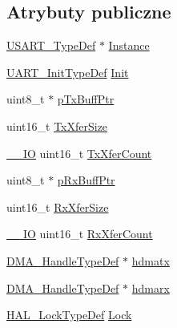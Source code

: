 \subsection*{Atrybuty publiczne}
\begin{DoxyCompactItemize}
\item 
\hyperlink{struct_u_s_a_r_t___type_def}{U\+S\+A\+R\+T\+\_\+\+Type\+Def} $\ast$ \hyperlink{struct_____u_a_r_t___handle_type_def_aadd8a626e4d5dd937ee1b6461365831a}{Instance}
\item 
\hyperlink{struct_u_a_r_t___init_type_def}{U\+A\+R\+T\+\_\+\+Init\+Type\+Def} \hyperlink{struct_____u_a_r_t___handle_type_def_a56ed519d3ec77350c528fb8536bd9f5a}{Init}
\item 
uint8\+\_\+t $\ast$ \hyperlink{struct_____u_a_r_t___handle_type_def_aab963198dfbbcf98902222de810fcc31}{p\+Tx\+Buff\+Ptr}
\item 
uint16\+\_\+t \hyperlink{struct_____u_a_r_t___handle_type_def_a1ba050351021762bf0414f9af78080c7}{Tx\+Xfer\+Size}
\item 
\hyperlink{core__sc300_8h_aec43007d9998a0a0e01faede4133d6be}{\+\_\+\+\_\+\+IO} uint16\+\_\+t \hyperlink{struct_____u_a_r_t___handle_type_def_a640bb2017f3d6c58937c9cc8f0c866c2}{Tx\+Xfer\+Count}
\item 
uint8\+\_\+t $\ast$ \hyperlink{struct_____u_a_r_t___handle_type_def_a3b693f9fad7d2feed3103b296e8960a8}{p\+Rx\+Buff\+Ptr}
\item 
uint16\+\_\+t \hyperlink{struct_____u_a_r_t___handle_type_def_adcd45d8ba72e0883dc85a6f217437809}{Rx\+Xfer\+Size}
\item 
\hyperlink{core__sc300_8h_aec43007d9998a0a0e01faede4133d6be}{\+\_\+\+\_\+\+IO} uint16\+\_\+t \hyperlink{struct_____u_a_r_t___handle_type_def_a04c4b8902fadb460835b8856123453e1}{Rx\+Xfer\+Count}
\item 
\hyperlink{group___d_m_a___exported___types_ga41b754a906b86bce54dc79938970138b}{D\+M\+A\+\_\+\+Handle\+Type\+Def} $\ast$ \hyperlink{struct_____u_a_r_t___handle_type_def_afdedbb0ffa1d4bc145a01434d4794c92}{hdmatx}
\item 
\hyperlink{group___d_m_a___exported___types_ga41b754a906b86bce54dc79938970138b}{D\+M\+A\+\_\+\+Handle\+Type\+Def} $\ast$ \hyperlink{struct_____u_a_r_t___handle_type_def_aad7929af8d6acf108c85fe9c7b83c128}{hdmarx}
\item 
\hyperlink{stm32f4xx__hal__def_8h_ab367482e943333a1299294eadaad284b}{H\+A\+L\+\_\+\+Lock\+Type\+Def} \hyperlink{struct_____u_a_r_t___handle_type_def_a203cf57913d43137feeb4fe24fe38af2}{Lock}
\item 

\end{DoxyCompactItemize}
